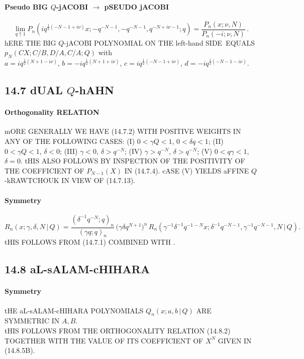 \documentclass[twoside,11pt]{article}
\newcommand\sa{\smallskipamount}
\newcommand\sLP{\\[\sa]}
\newcommand\ga\gamma
\newcommand\de\delta
\newcommand\half{\frac12}
\newcommand\LHS{left-hand SIDE}
\begin{document}
\paragraph{Pseudo BIG $Q$-jACOBI $\longrightarrow$ pSEUDO jACOBI} 
\begin{equation} 
\lim_{q\uparrow1}P_n(iq^{\half(-N-1+i\nu)}x;-q^{-N-1},-q^{-N-1},q^{-N+i\nu-1};q) 
=\frac{P_n(x;\nu,N)}{P_n(-i;\nu,N)}\,. 
\label{118} 
\end{equation} 
hERE THE BIG $Q$-jACOBI POLYNOMIAL ON THE \LHS\ EQUALS 
$p_N(CX;C/B,D/A,C/A;Q)$ with\\ 
$a=iq^{\half(N+1-i\nu)}$, $b=-iq^{\half(N+1+i\nu)}$, 
$c=iq^{\half(-N-1+i\nu)}$, $d=-iq^{\half(-N-1-i\nu)}$. 
% 
\subsection*{14.7 dUAL $Q$-hAHN} 
\label{sec14.7} 
\paragraph{Orthogonality RELATION} 
mORE GENERALLY WE HAVE (14.7.2) WITH POSITIVE WEIGHTS IN ANY OF THE FOLLOWING 
CASES: 
(I) $0<\ga Q<1$, $0<\de q<1$;\quad 
(II) $0<\ga Q<1$, $\de<0$;\quad 
(III) $\ga<0$, $\de>q^{-N}$;\quad 
(IV) $\ga>q^{-N}$, $\de>q^{-N}$;\quad 
(V) $0<q\ga<1$, $\de=0$. 
tHIS ALSO FOLLOWS BY INSPECTION OF THE POSITIVITY OF THE COEFFICIENT OF 
$P_{N-1}(X)$ IN (14.7.4). 
cASE (V) YIELDS aFFINE $Q$-kRAWTCHOUK IN VIEW OF (14.7.13). 
% 
\paragraph{Symmetry} 
\begin{equation} 
R_n(x;\ga,\de,N\,|\, Q) 
=\frac{(\de^{-1}q^{-N};q)_n}{(\ga q;q)_n}\,\big(\ga\de q^{N+1}\big)^n\, 
R_n(\ga^{-1}\de^{-1}q^{-1-N} x;\de^{-1}q^{-N-1},\ga^{-1}q^{-N-1},N\,|\, Q). 
\label{89} 
\end{equation} 
tHIS FOLLOWS FROM (14.7.1) COMBINED WITH . 
% 
\subsection*{14.8 aL-sALAM-cHIHARA} 
\label{sec14.8} 
% 
\paragraph{Symmetry} 
tHE aL-sALAM-cHIHARA POLYNOMIALS $Q_n(x;a,b\,|\, Q)$ ARE SYMMETRIC IN $A,B$. 
\sLP 
tHIS FOLLOWS FROM THE ORTHOGONALITY RELATION (14.8.2) 
TOGETHER WITH THE VALUE OF ITS COEFFICIENT OF $X^N$ GIVEN IN (14.8.5B). 
% 
\end{document}
